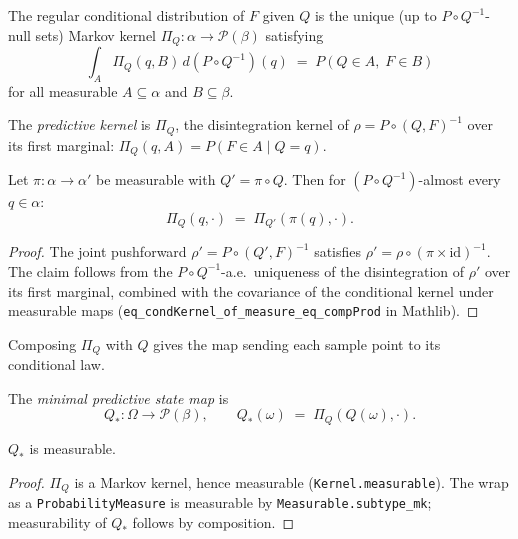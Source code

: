 The regular conditional distribution of $F$ given $Q$ is the unique (up to
$P \circ Q^{-1}$-null sets) Markov kernel $\Pi_Q : \alpha \to \mathcal{P}(\beta)$
satisfying
\[
  \int_A \Pi_Q(q, B)\, d(P \circ Q^{-1})(q) \;=\; P(Q \in A,\; F \in B)
\]
for all measurable $A \subseteq \alpha$ and $B \subseteq \beta$.

\begin{definition}
\label{def:predictive-kernel}
The \emph{predictive kernel} is $\Pi_Q$, the disintegration kernel of
$\rho = P \circ (Q, F)^{-1}$ over its first marginal:
$\Pi_Q(q, A) = P(F \in A \mid Q = q)$.
\end{definition}

\begin{proposition}
\label{prop:predictive-compat}
Let $\pi : \alpha \to \alpha'$ be measurable with $Q' = \pi \circ Q$.  Then
for $(P \circ Q^{-1})$-almost every $q \in \alpha$:
\[
  \Pi_Q(q, \cdot) \;=\; \Pi_{Q'}(\pi(q), \cdot).
\]
\end{proposition}
\begin{proof}
The joint pushforward $\rho' = P \circ (Q', F)^{-1}$ satisfies $\rho' = \rho
\circ (\pi \times \mathrm{id})^{-1}$.  The claim follows from the
$P \circ Q^{-1}$-a.e.\ uniqueness of the disintegration of $\rho'$ over its
first marginal, combined with the covariance of the conditional kernel under
measurable maps (\texttt{eq\_condKernel\_of\_measure\_eq\_compProd} in Mathlib).
\end{proof}

Composing $\Pi_Q$ with $Q$ gives the map sending each sample point to its
conditional law.

\begin{definition}
\label{def:minimal-predictive}
The \emph{minimal predictive state map} is
\[
  Q_* : \Omega \to \mathcal{P}(\beta), \qquad Q_*(\omega) \;=\; \Pi_Q(Q(\omega), \cdot).
\]
\end{definition}

\begin{proposition}[Measurability]
\label{prop:measurability}
$Q_*$ is measurable.
\end{proposition}
\begin{proof}
$\Pi_Q$ is a Markov kernel, hence measurable (\texttt{Kernel.measurable}).
The wrap as a \texttt{ProbabilityMeasure} is measurable by
\texttt{Measurable.subtype\_mk}; measurability of $Q_*$ follows by composition.
\end{proof}

